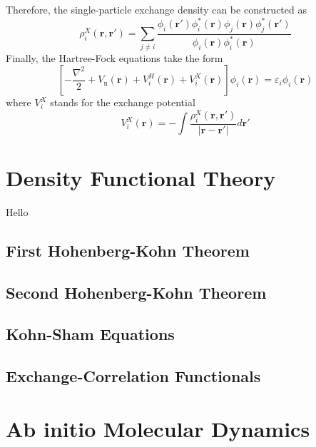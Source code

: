 Therefore, the single-particle exchange density can be constructed as 
\begin{equation}
  \label{eq36}
  \rho^X_i(\mathbf{r}, \mathbf{r'}) = \sum_{j\neq i}\frac{\phi_i(\mathbf{r'})\phi^*_i(\mathbf{r})\phi_j(\mathbf{r})\phi^*_j(\mathbf{r'})}{\phi_i(\mathbf{r})\phi^*_i(\mathbf{r})}
\end{equation}
Finally, the Hartree-Fock equations take the form 
\begin{equation}
  \label{eq37}
  \left[-\frac{\nabla^2}{2} + V_{\text{n}}(\mathbf{r}) + V^H_i(\mathbf{r}) + V^X_i(\mathbf{r})\right]\phi_i(\mathbf{r}) = \varepsilon_i \phi_i(\mathbf{r})
\end{equation}
where $V^X_i$ stands for the exchange potential
\begin{equation}
  \label{eq38}
  V^X_i(\mathbf{r}) = -\int \frac{\rho^X_i(\mathbf{r}, \mathbf{r'})}{|\mathbf{r} - \mathbf{r'}|} d\mathbf{r'}
\end{equation}


\section{Density Functional Theory}

Hello 


\subsection{First Hohenberg-Kohn Theorem}

\subsection{Second Hohenberg-Kohn Theorem}

\subsection{Kohn-Sham Equations}

\subsection{Exchange-Correlation Functionals}

\section{Ab initio Molecular Dynamics}

